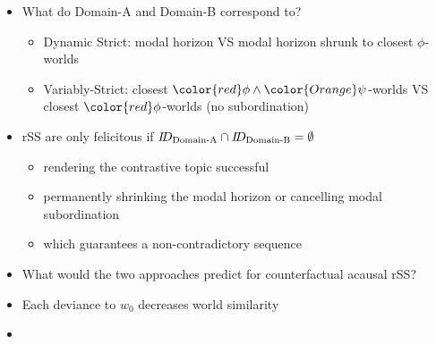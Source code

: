 \begin{frame}[t]
    \subsectionpage\vskip 9pt
    \begin{itemize}
        \item What do Domain-A and Domain-B correspond to?\vskip 9pt
            \begin{itemize}
                \item<2-> Dynamic Strict: modal horizon VS modal horizon shrunk to closest {\color{red}$\phi$}-worlds
                \item<3-> Variably-Strict: closest ${\color{red}\phi}\land{\color{Orange}\psi}$-worlds VS closest ${\color{red}\phi}$-worlds (no subordination)
            \end{itemize}\vskip 18pt
        \item<4-> rSS are only felicitous if ${I\hspace{-0.75mm}D_{\text{Domain-A}}}\cap{I\hspace{-0.75mm}D_{\text{Domain-B}}}=\emptyset$\vskip 9pt
            \begin{itemize}
                \item<5-> rendering the contrastive topic successful
                \item<6-> permanently shrinking the modal horizon or cancelling modal subordination
                \item<7-> which guarantees a non-contradictory sequence
            \end{itemize}\vskip 18pt
        \item<8-> What would the two approaches predict for counterfactual acausal rSS?
    \end{itemize}
\end{frame}

\begin{frame}[t]
	\subsectionpage\vskip 9pt
	\begin{itemize}
        \item<1->	Each deviance to $w_0$ decreases world similarity
	\end{itemize}\vspace{-5mm}
	\vspace{-7.5mm}
	\begin{itemize}
        \item<4->  
	\end{itemize}
\end{frame}

